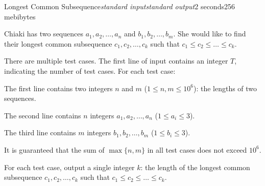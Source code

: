 \begin{problem}{Longest Common Subsequence}{\textsl{standard input}}{\textsl{standard output}}{2 seconds}{256 mebibytes}

Chiaki has two sequences $a_1,a_2,\ldots,a_n$ and $b_1,b_2,\ldots,b_m$. She would like to find their longest common subsequence $c_1,c_2,\ldots,c_k$ such that $c_1 \le c_2 \le \ldots \le c_k$.

\InputFile
There are multiple test cases. The first line of input contains an integer $T$, indicating the number of test cases. For each test case:

The first line contains two integers $n$ and $m$ ($1 \le n, m \le 10^6$): the lengths of two sequences.

The second line contains $n$ integers $a_1,a_2,\ldots,a_n$ ($1 \le a_i \le 3$).

The third line contains $m$ integers $b_1,b_2,\ldots,b_m$ ($1 \le b_i \le 3$).

It is guaranteed that the sum of $\max\{n,m\}$ in all test cases does not exceed $10^6$.


\OutputFile
For each test case, output a single integer $k$: the length of the longest common subsequence $c_1,c_2,\ldots,c_k$ such that $c_1 \le c_2 \le \ldots \le c_k$.




\Example

\begin{example}
%
\end{example}

\end{problem}
